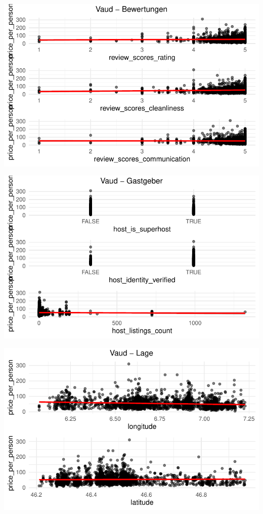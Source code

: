 \documentclass[
  journal,
]{IEEEtran}%
\begin{document}
\includegraphics{main_files/figure-pdf/unnamed-chunk-13-4.pdf}

\includegraphics{main_files/figure-pdf/unnamed-chunk-13-5.pdf}

\includegraphics{main_files/figure-pdf/unnamed-chunk-13-6.pdf}
\end{document}
